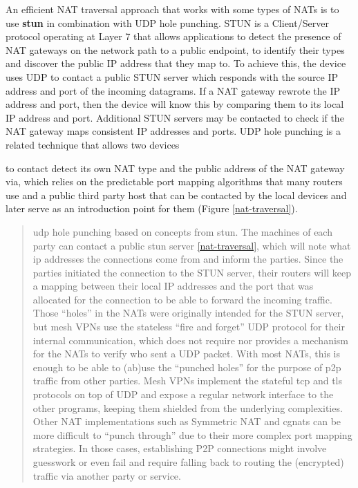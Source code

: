 An efficient NAT traversal approach that works with some types of NATs
is to use \textbf{\gls{stun}} \autocite{stunRFC} in combination with UDP
hole punching. STUN is a Client/Server protocol operating at Layer 7
that allows applications to detect the presence of NAT gateways on the
network path to a public endpoint, to identify their types and discover
the public IP address that they map to. To achieve this, the device uses
UDP to contact a public STUN server which responds with the source IP
address and port of the incoming datagrams. If a NAT gateway rewrote the
IP address and port, then the device will know this by comparing them to
its local IP address and port. Additional STUN servers may be contacted
to check if the NAT gateway maps consistent IP addresses and ports. UDP
hole punching is a related technique that allows two devices

to contact detect its own NAT type and the public address of the NAT
gateway via, which relies on the predictable port mapping algorithms
that many routers use and a public third party host that can be
contacted by the local devices and later serve as an introduction point
for them (Figure \ref{nat-traversal}).


\begin{quote}
\gls{udp} hole punching based on concepts from \gls{stun}. The machines
of each party can contact a public \gls{stun} server
\ref{nat-traversal}, which will note what \gls{ip} addresses the
connections come from and inform the parties. Since the parties
initiated the connection to the STUN server, their routers will keep a
mapping between their local IP addresses and the port that was allocated
for the connection to be able to forward the incoming traffic. Those
``holes'' in the NATs were originally intended for the STUN server, but
mesh VPNs use the stateless ``fire and forget'' UDP protocol for their
internal communication, which does not require nor provides a mechanism
for the NATs to verify who sent a UDP packet. With most NATs, this is
enough to be able to (ab)use the ``punched holes'' for the purpose of
\gls{p2p} traffic from other parties. Mesh VPNs implement the stateful
\gls{tcp} and \gls{tls} protocols on top of UDP and expose a regular
network interface to the other programs, keeping them shielded from the
underlying complexities. Other NAT implementations such as Symmetric NAT
and \glspl{cgnat} can be more difficult to ``punch through'' due to
their more complex port mapping strategies. In those cases, establishing
P2P connections might involve guesswork or even fail and require falling
back to routing the (encrypted) traffic via another party or service.
\end{quote}

